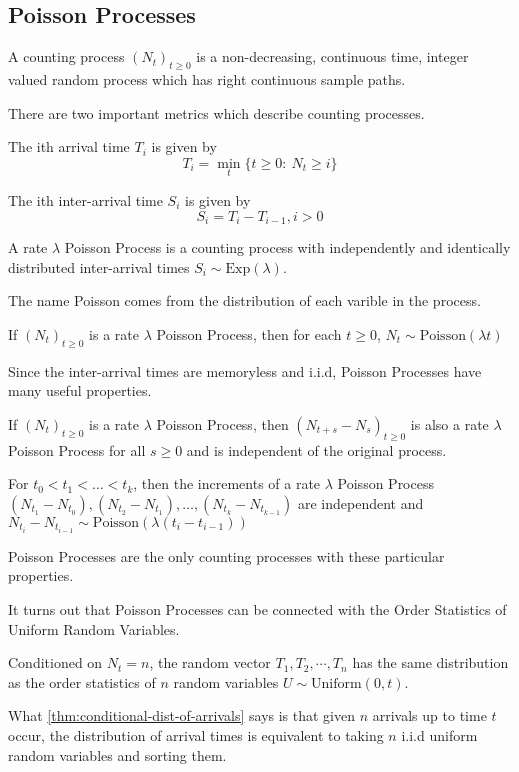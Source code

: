 \subsection{Poisson Processes}
\begin{definition}
	A counting process $(N_t)_{t\geq 0}$ is a non-decreasing, continuous time, integer valued random process which has right continuous sample paths.
	\label{defn:counting-process}
\end{definition}
There are two important metrics which describe counting processes.
\begin{definition}
	The ith arrival time $T_i$ is given by \[
		T_i = \min_t \{ t \geq 0: \ N_t \geq i \}
	\]
	\label{defn:arrival-time}
\end{definition}
\begin{definition}
	The ith inter-arrival time $S_i$ is given by \[
		S_i = T_i - T_{i-1}, i > 0
	\]
	\label{defn:inter-arrival-time}
\end{definition}
\begin{definition}
	A rate $\lambda$ Poisson Process is a counting process with independently and identically distributed inter-arrival times $S_i \sim \text{Exp}(\lambda)$.
	\label{defn:poisson-process}
\end{definition}
The name Poisson comes from the distribution of each varible in the process.
\begin{theorem}
	If $(N_t)_{t\geq 0}$ is a rate $\lambda$ Poisson Process, then for each $t\geq 0$, $N_t\sim \text{Poisson}(\lambda t)$
	\label{thm:poisson-process}
\end{theorem}
Since the inter-arrival times are memoryless and i.i.d, Poisson Processes have many useful properties.
\begin{theorem}
	If $(N_t)_{t\geq 0}$ is a rate $\lambda$ Poisson Process, then $(N_{t+s} - N_s)_{t\geq0}$ is also a rate $\lambda$ Poisson Process for all $s \geq 0$ and is independent of the original process.
	\label{thm:indep-poisson-process}
\end{theorem}
\begin{theorem}
	For $t_0 < t_1 <\ldots< t_k$, then the increments of a rate $\lambda$ Poisson Process $(N_{t_1} - N_{t_0}), (N_{t_2} - N_{t_1}),\ldots,(N_{t_k} - N_{t_{k-1}})$ are independent and $N_{t_i} - N_{t_{i-1}} \sim \text{Poisson}(\lambda(t_i - t_{i-1}))$
	\label{thm:indep-increments}
\end{theorem}
Poisson Processes are the only counting processes with these particular properties.

It turns out that Poisson Processes can be connected with the Order Statistics of Uniform Random Variables.
\begin{theorem}
	Conditioned on $N_t = n$, the random vector $T_1, T_2, \cdots, T_n$ has the same distribution as the order statistics of $n$ random variables $U\sim \text{Uniform}(0, t)$.
	\label{thm:conditional-dist-of-arrivals}
\end{theorem}
What \cref{thm:conditional-dist-of-arrivals} says is that given $n$ arrivals up to time $t$ occur, the distribution of arrival times is equivalent to taking $n$ i.i.d uniform random variables and sorting them.


